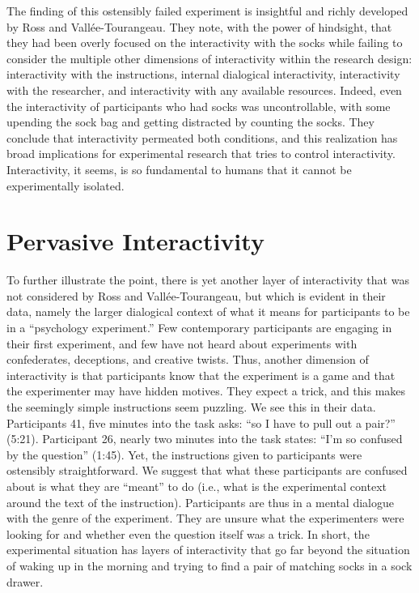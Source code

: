 \documentclass[twocolumn, issue, reflection, authordate]{jote-new-article}
\begin{document}
The finding of this ostensibly failed experiment is insightful and
richly developed by Ross and Vallée-Tourangeau. They note, with the
power of hindsight, that they had been overly focused on the
interactivity with the socks while failing to consider the multiple
other dimensions of interactivity within the research design:
interactivity with the instructions, internal dialogical interactivity,
interactivity with the researcher, and interactivity with any available
resources. Indeed, even the interactivity of participants who had socks
was uncontrollable, with some upending the sock bag and getting
distracted by counting the socks. They conclude that interactivity
permeated both conditions, and this realization has broad implications
for experimental research that tries to control interactivity.
Interactivity, it seems, is so fundamental to humans that it cannot be
experimentally isolated.

\section*{Pervasive Interactivity}

To further illustrate the point, there is yet another layer of
interactivity that was not considered by Ross and Vallée-Tourangeau, but
which is evident in their data, namely the larger dialogical context of
what it means for participants to be in a ``psychology experiment.'' Few
contemporary participants are engaging in their first experiment, and
few have not heard about experiments with confederates, deceptions, and
creative twists. Thus, another dimension of interactivity is that
participants know that the experiment is a game and that the
experimenter may have hidden motives. They expect a trick, and this
makes the seemingly simple instructions seem puzzling. We see this in
their data. Participants 41, five minutes into the task asks: ``so I
have to pull out a pair?'' (5:21). Participant 26, nearly two minutes
into the task states: ``I'm so confused by the question'' (1:45). Yet,
the instructions given to participants were ostensibly straightforward.
We suggest that what these participants are confused about is what they
are ``meant'' to do (i.e., what is the experimental context around the
text of the instruction). Participants are thus in a mental dialogue
with the genre of the experiment. They are unsure what the experimenters
were looking for and whether even the question itself was a trick. In
short, the experimental situation has layers of interactivity that go
far beyond the situation of waking up in the morning and trying to find
a pair of matching socks in a sock drawer.
\end{document}
